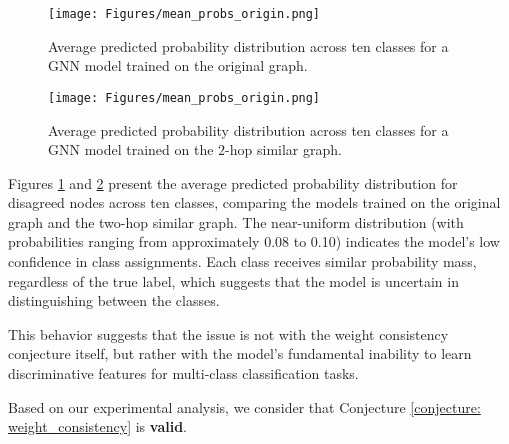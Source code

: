\begin{figure}[H]
    \vskip 0.2in
    \begin{center}    \centerline{\texttt{[image: Figures/mean\_probs\_origin.png]}}
    \caption{Average predicted probability distribution across ten classes for a GNN model trained on the original graph.}
    \label{origin}
    \end{center}
    \vskip -0.2in
\end{figure}

\begin{figure}[H]
    \vskip 0.2in
    \begin{center}
    \centerline{\texttt{[image: Figures/mean\_probs\_origin.png]}}
    \caption{Average predicted probability distribution across ten classes for a GNN model trained on the $2$-hop similar graph.}
    \label{hophop}
    \end{center}
    \vskip -0.2in
\end{figure}

Figures \ref{origin} and \ref{hophop} present the average predicted probability distribution for disagreed nodes across ten classes, comparing the models trained on the original graph and the two-hop similar graph. The near-uniform distribution (with probabilities ranging from approximately 0.08 to 0.10) indicates the model's low confidence in class assignments. Each class receives similar probability mass, regardless of the true label, which suggests that the model is uncertain in distinguishing between the classes.

This behavior suggests that the issue is not with the weight consistency conjecture itself, but rather with the model's fundamental inability to learn discriminative features for multi-class classification tasks. 


Based on our experimental analysis, we consider that Conjecture \ref{conjecture: weight_consistency} is \textbf{valid}.


